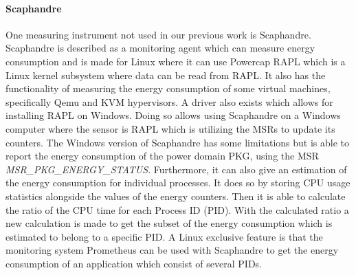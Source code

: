 \paragraph{Scaphandre}
One measuring instrument not used in our previous work is Scaphandre\cite{scaphandre}. Scaphandre is described as a monitoring agent which can measure energy consumption and is made for Linux where it can use Powercap RAPL which is a Linux kernel subsystem where data can be read from RAPL. It also has the functionality of measuring the energy consumption of some virtual machines, specifically Qemu and KVM hypervisors. A driver also exists which allows for installing RAPL on Windows.\cite{RAPL_Windows} Doing so allows using Scaphandre on a Windows computer where the sensor is RAPL which is utilizing the MSRs to update its counters. The Windows version of Scaphandre has some limitations but is able to report the energy consumption of the power domain PKG, using the MSR \textit{MSR\_PKG\_ENERGY\_STATUS}. Furthermore, it can also give an estimation of the energy consumption for individual processes. It does so by storing CPU usage statistics alongside the values of the energy counters. Then it is able to calculate the ratio of the CPU time for each Process ID (PID). With the calculated ratio a new calculation is made to get the subset of the energy consumption which is estimated to belong to a specific PID. A Linux exclusive feature is that the monitoring system Prometheus can be used with Scaphandre to get the energy consumption of an application which consist of several PIDs.